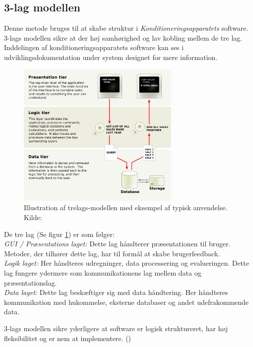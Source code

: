 \subsection{3-lag modellen}
Denne metode bruges til at skabe struktur i \textit{Konditioneringsapparatets} software. 3-lags modellen sikre at der høj samhørighed og lav kobling mellem de tre lag. Inddelingen af konditioneringsapparatets software kan ses i udviklingsdokumentation under system designet for mere information. 
\begin{figure}[H]
	\centering
\includegraphics[width = 0.7\textwidth]{billeder/trelagsmodel.png}
\caption{Illustration af trelags-modellen med eksempel af typisk anvendelse. Kilde: \cite{Billede:2}}\label{fig:3lagsmodel}
\end{figure}

De tre lag (Se figur \ref{fig:3lagsmodel}) er som følger: \\
\textit{GUI / Præsentations laget:} Dette lag håndterer præsentationen til bruger. Metoder, der tilhører dette lag, har til formål at skabe brugerfeedback. \\
\textit{Logik laget: } Her håndteres udregninger, data processering og evalueringen. Dette lag fungere ydermere som kommunikationens lag mellem data og præsentationslag. 
\\ \textit{Data laget: } Dette lag beskæftiger sig med data håndtering. Her håndteres kommunikation med hukommelse, eksterne databaser og andet udefrakommende data.

3-lags modellen sikre yderligere at software er logisk struktureret, har høj fleksibilitet og er nem at implementere. (\cite{RefWorks:31})
